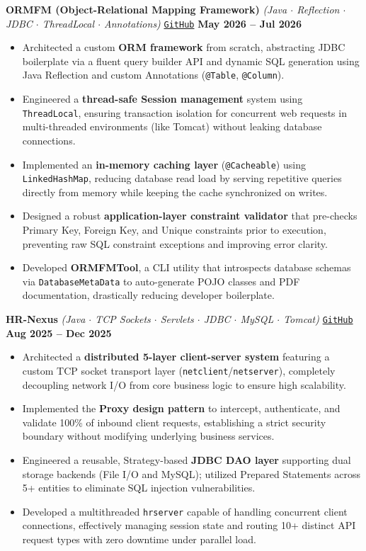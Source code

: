 \documentclass[a4paper,10pt]{article}
\begin{document}
\textbf{ORMFM (Object-Relational Mapping Framework)} \textit{(Java $\cdot$ Reflection $\cdot$ JDBC $\cdot$ ThreadLocal $\cdot$ Annotations)}
\hfill \href{https://github.com/ashvin-parmar/orm-fm}{\texttt{GitHub}} \quad \textbf{May 2026 -- Jul 2026}
\begin{itemize}
  \item Architected a custom \textbf{ORM framework} from scratch, abstracting JDBC boilerplate via a fluent query builder API and dynamic SQL generation using Java Reflection and custom Annotations (\texttt{@Table}, \texttt{@Column}).
  \item Engineered a \textbf{thread-safe Session management} system using \texttt{ThreadLocal}, ensuring transaction isolation for concurrent web requests in multi-threaded environments (like Tomcat) without leaking database connections.
  \item Implemented an \textbf{in-memory caching layer} (\texttt{@Cacheable}) using \texttt{LinkedHashMap}, reducing database read load by serving repetitive queries directly from memory while keeping the cache synchronized on writes.
  \item Designed a robust \textbf{application-layer constraint validator} that pre-checks Primary Key, Foreign Key, and Unique constraints prior to execution, preventing raw SQL constraint exceptions and improving error clarity.
  \item Developed \textbf{ORMFMTool}, a CLI utility that introspects database schemas via \texttt{DatabaseMetaData} to auto-generate POJO classes and PDF documentation, drastically reducing developer boilerplate.
\end{itemize}

\vspace{0.5mm}

\textbf{HR-Nexus} \textit{(Java $\cdot$ TCP Sockets $\cdot$ Servlets $\cdot$ JDBC $\cdot$ MySQL $\cdot$ Tomcat)}
\hfill \href{https://github.com/ashvin-parmar/HR-Nexus}{\texttt{GitHub}} \quad \textbf{Aug 2025 -- Dec 2025}
\begin{itemize}
  \item Architected a \textbf{distributed 5-layer client-server system} featuring a custom TCP socket transport layer (\texttt{netclient}/\texttt{netserver}), completely decoupling network I/O from core business logic to ensure high scalability.
  \item Implemented the \textbf{Proxy design pattern} to intercept, authenticate, and validate 100\% of inbound client requests, establishing a strict security boundary without modifying underlying business services.
  \item Engineered a reusable, Strategy-based \textbf{JDBC DAO layer} supporting dual storage backends (File I/O and MySQL); utilized Prepared Statements across 5+ entities to eliminate SQL injection vulnerabilities.
  \item Developed a multithreaded \texttt{hrserver} capable of handling concurrent client connections, effectively managing session state and routing 10+ distinct API request types with zero downtime under parallel load.
\end{itemize}
\end{document}
